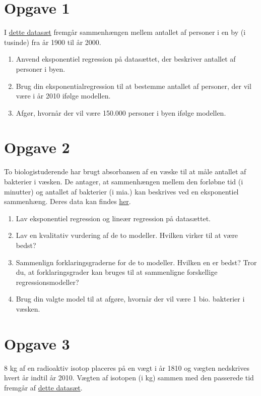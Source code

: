 \section*{Opgave 1}

I \href{https://github.com/ChristianJLex/TeachingNotes/raw/master/2022-2023/Data%20og%20lign/Befolkningsdata.xlsx}{\color{blue!60} dette datasæt} fremgår sammenhængen mellem antallet af personer i en by (i tusinde) fra år 1900 til år 2000.

\begin{enumerate}[label=\roman*)]
	\item Anvend eksponentiel regression på datasættet, der beskriver antallet af personer i byen.
	\item Brug din eksponentialregression til at bestemme antallet af personer, der vil være i år 2010 ifølge modellen.
	\item Afgør, hvornår der vil være 150.000 personer i byen ifølge modellen. 
\end{enumerate}


\section*{Opgave 2}
To biologistuderende har brugt absorbansen af en væske til at måle antallet af bakterier i væsken. De antager, at sammenhængen mellem den forløbne tid (i minutter) og antallet af bakterier (i mia.) kan beskrives ved en eksponentiel sammenhæng. Deres data kan findes \href{https://github.com/ChristianJLex/TeachingNotes/raw/master/2022-2023/Data%20og%20lign/Bakteriedata.xlsx}{\color{blue!60} her}.

\begin{enumerate}[label=\roman*)]
	\item Lav eksponentiel regression og lineær regression på datasættet.
	\item Lav en kvalitativ vurdering af de to modeller. Hvilken virker til at være bedst?
	\item Sammenlign forklaringsgraderne for de to modeller. Hvilken en er bedst? Tror du, at forklaringsgrader kan bruges til at sammenligne forskellige regressionsmodeller?
	\item Brug din valgte model til at afgøre, hvornår der vil være 1 bio. bakterier i væsken. 
\end{enumerate}

\section*{Opgave 3}
8 kg af en radioaktiv isotop placeres på en vægt i år 1810 og vægten nedskrives hvert år indtil år 2010. Vægten af isotopen (i kg) sammen med den passerede tid fremgår af \href{https://github.com/ChristianJLex/TeachingNotes/raw/master/2022-2023/Data%20og%20lign/Isotopdata.xlsx}{\color{blue!60} dette datasæt}.

